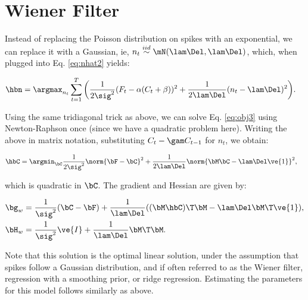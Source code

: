 \section{Wiener Filter} \label{sec:wiener}

Instead of replacing the Poisson distribution on spikes with an exponential, we can replace it with a Gaussian, ie,  $n_t \overset{iid}{\sim} \mN(\lam \Del, \lam \Del)$, which, when plugged into Eq. \eqref{eq:nhat2} yields:

\begin{align} \label{eq:obj3}
\hbn &= \argmax_{n_t}  \sum_{t=1}^T \bigg( \frac{1}{2 \sig^2}(F_t - \alpha(C_t + \beta))^2  + 
 \frac{1}{2 \lam \Del}(n_t - \lam \Del)^2\bigg).
\end{align}

Using the same tridiagonal trick as above, we can solve Eq. \eqref{eq:obj3} using Newton-Raphson once (since we have a quadratic problem here).  Writing the above in matrix notation, substituting $C_t - \gam C_{t-1}$ for $n_t$, we obtain:

\begin{align}   \label{eq:w2}
\hbC&= \argmin_{\bC} \frac{1}{2\sig^2} \norm{\bF - \bC}^2 + \frac{1}{2\lam\Del} \norm{\bM \bC - \lam\Del\ve{1}}^2,
\end{align}

\noindent which is quadratic in $\bC$.  The gradient and Hessian are given by:

\begin{align}
\bg_w &= \frac{1}{\sig^2} (\bC - \bF) + \frac{1}{\lam\Del} ( (\bM \hbC)\T \bM - \lam\Del \bM\T \ve{1}), \\
\bH_w &= \frac{1}{\sig^2} \ve{I} + \frac{1}{\lam\Del} \bM\T \bM.
\end{align}

Note that this solution is the optimal linear solution, under the assumption that spikes follow a Gaussian distribution, and if often referred to as the Wiener filter, regression with a smoothing prior, or ridge regression.  Estimating the parameters for this model follows similarly as above. 
